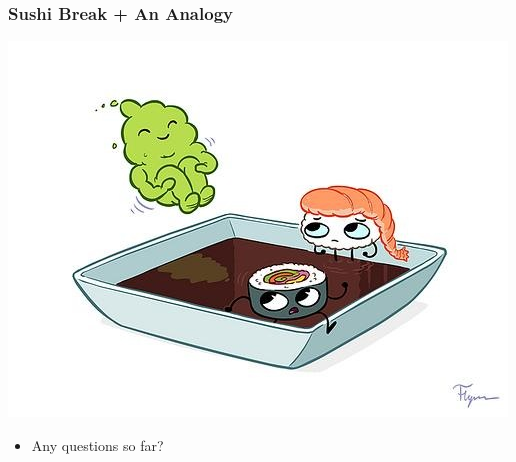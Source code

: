 \documentclass{beamer}
\begin{document}
\begin{frame}
    \frametitle{Sushi Break + An Analogy}

    \begin{center}
        \includegraphics[scale=0.4]{sushi.jpg}\\
    \end{center}


    \begin{itemize}
        \item Any questions so far?
    \end{itemize}
\end{frame}
\end{document}
